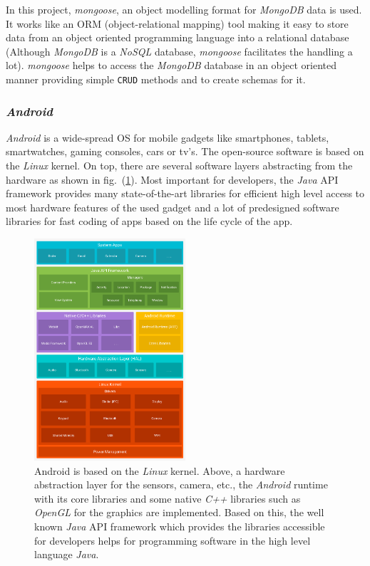 In this project, \textit{mongoose}, an object modelling format for \textit{MongoDB} data is used. It works like an ORM (object-relational mapping) tool making it easy to store data from an object oriented programming language into a relational database (Although \textit{MongoDB} is a \textit{NoSQL} database, \textit{mongoose} facilitates the handling a lot).  \textit{mongoose} helps to access the \textit{MongoDB} database in an object oriented manner providing simple \texttt{CRUD} methods and to create schemas for it. 

\subsubsection{\textit{Android}}
\label{subsubsec:android}
\textit{Android} is a wide-spread OS for mobile gadgets like smartphones, tablets, smartwatches, gaming consoles, cars or tv's. The open-source software is based on the \textit{Linux} kernel. On top, there are several software layers abstracting from the hardware as shown in fig.\ (\ref{fig:androidstack}). Most important for developers, the \textit{Java} API framework provides many state-of-the-art libraries for efficient high level access to most hardware features of the used gadget and a lot of predesigned software libraries for fast coding of apps based on the life cycle of the app.   

\begin{figure}[htbp]
	\includegraphics[width=0.5\textwidth]{images/androidstack.png}
	\centering
	\caption[Android stack]{Android is based on the \textit{Linux} kernel. Above, a hardware abstraction layer for the sensors, camera, etc., the \textit{Android} runtime with its core libraries and some native \textit{C++} libraries such as \textit{OpenGL} for the graphics are implemented. Based on this, the well known \textit{Java} API framework which provides the libraries accessible for developers helps for programming software in the high level language \textit{Java}.\footnotemark}
	\label{fig:androidstack}
\end{figure} 

